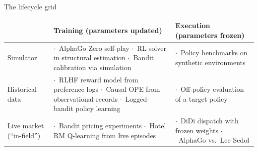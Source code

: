 \newcommand{\tabitem}{{\small$\cdot$}~}
\begin{frame}{The lifecycle grid}

\begin{center}
\small
\begin{tabular}{|p{1.9cm}|p{4.1cm}|p{4.1cm}|}
\hline
 & Training (parameters updated) & Execution (parameters frozen) \\
\hline
Simulator &
  \tabitem AlphaGo Zero self-play \newline
  \tabitem RL solver in structural estimation \newline
  \tabitem Bandit calibration via simulation &
  \tabitem Policy benchmarks on synthetic environments \\
\hline
Historical data &
  \tabitem RLHF reward model from preference logs \newline
  \tabitem Causal OPE from observational records \newline
  \tabitem Logged-bandit policy learning &
  \tabitem Off-policy evaluation of a target policy \\
\hline
Live market (``in-field'') &
  \tabitem Bandit pricing experiments \newline
  \tabitem Hotel RM Q-learning from live episodes &
  \tabitem DiDi dispatch with frozen weights \newline
  \tabitem AlphaGo vs.\ Lee Sedol \\
\hline
\end{tabular}
\end{center}

\end{frame}

